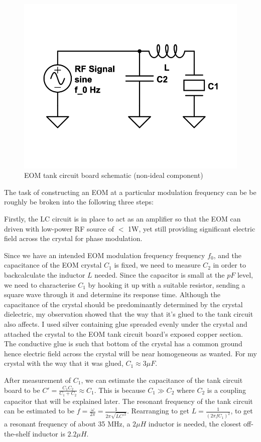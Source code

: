 \documentclass[12pt,A4Paper]{article}
\begin{document}
\begin{figure}[H]
    \centering
    \includegraphics[width=.5\textwidth]{eom-tank-cirucuit1.png}
    \caption{EOM tank circuit board schematic (non-ideal component)}
    \label{fig:eom-tank-cirucuit1}
\end{figure}

The task of constructing an EOM at a particular modulation frequency can be be roughly be broken into the following three steps:
\par
Firstly, the LC circuit is in place to act as an amplifier so that the EOM can driven with low-power RF source of $<$ 1W, yet still providing significant electric field across the crystal for phase modulation. 
\par
Since we have an intended EOM modulation frequency frequency $f_0$, and the capacitance of the EOM crystal $C_1$ is fixed, we need to measure $C_2$ in order to backcalculate the inductor $L$ needed. Since the capacitor is small at the $pF$ level, we need to characterise $C_1$ by hooking it up with a suitable resistor, sending a square wave through it and determine its response time. Although the capacitance of the crystal should be predominantly determined by the crystal dielectric, my observation showed that the way that it's glued to the tank circuit also affects. I used silver containing glue spreaded evenly under the crystal and attached the crystal to the EOM tank circuit board's exposed copper section. The conductive glue is such that bottom of the crystal has a common ground hence electric field across the crystal will be near homogeneous as wanted. For my crystal with the way that it was glued, $C_1 \approx 3 \mu F$.
\par
After measurement of $C_1$, we can estimate the capacitance of the tank circuit board to be $C' = \frac{C_1C_2}{C_1+C_2} \approx C_1$. This is because $C_1 \gg C_2$ where $C_2$ is a coupling capacitor that will be explained later. The resonant frequency of the tank circuit can be estimated to be $f = \frac{\omega}{2\pi} = \frac{1}{2\pi\sqrt{LC'^2}}$. Rearranging to get $L = \frac{1}{(2\pi f C_1)^2}$, to get a resonant frequency of about 35 MHz, a $2 \mu H$ inductor is needed, the closest off-the-shelf inductor is $2.2 \mu H$. 
\end{document}

